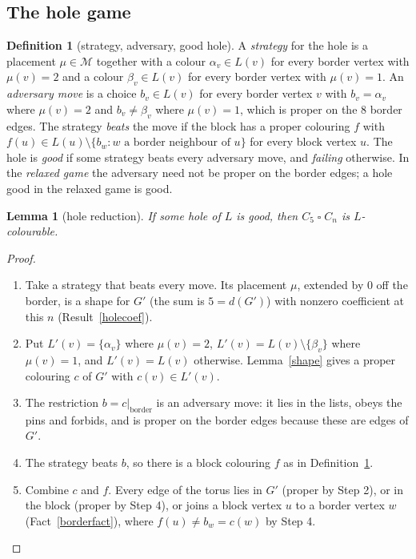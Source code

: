 \documentclass[11pt]{article}
\theoremstyle{plain}
\newtheorem{lemma}[theorem]{Lemma}
\theoremstyle{definition}
\newtheorem{definition}[theorem]{Definition}
\theoremstyle{remark}
\newcommand{\T}{\mathbin{\square}}
\newcommand{\sm}{\setminus}
\newenvironment{steps}[1][]{\begin{enumerate}[label=\textbf{Step \arabic*.},leftmargin=4.4em,itemsep=0.35em,#1]}{\end{enumerate}}
\begin{document}
\subsection{The hole game}

\begin{definition}[strategy, adversary, good hole]\label{game}
A \emph{strategy} for the hole is a placement $\mu \in \mathcal{M}$ together with a colour $\alpha_v \in L(v)$ for every
border vertex with $\mu(v) = 2$ and a colour $\beta_v \in L(v)$ for every border vertex with $\mu(v) = 1$. An
\emph{adversary move} is a choice $b_v \in L(v)$ for every border vertex $v$ with $b_v = \alpha_v$ where $\mu(v) = 2$ and
$b_v \ne \beta_v$ where $\mu(v) = 1$, which is proper on the 8 border edges. The strategy \emph{beats} the move if the block
has a proper colouring $f$ with $f(u) \in L(u) \sm \{b_w : w \text{ a border neighbour of } u\}$ for every block vertex $u$.
The hole is \emph{good} if some strategy beats every adversary move, and \emph{failing} otherwise. In the \emph{relaxed game}
the adversary need not be proper on the border edges; a hole good in the relaxed game is good.
\end{definition}

\begin{lemma}[hole reduction]\label{holered}
If some hole of $L$ is good, then $C_5 \T C_n$ is $L$-colourable.
\end{lemma}

\begin{proof}
\begin{steps}
\item Take a strategy that beats every move. Its placement $\mu$, extended by $0$ off the border, is a shape for $G'$
(the sum is $5 = d(G')$) with nonzero coefficient at this $n$ (Result~\ref{holecoef}).
\item Put $L'(v) = \{\alpha_v\}$ where $\mu(v) = 2$, $L'(v) = L(v) \sm \{\beta_v\}$ where $\mu(v) = 1$, and $L'(v) = L(v)$
otherwise. Lemma~\ref{shape} gives a proper colouring $c$ of $G'$ with $c(v) \in L'(v)$.
\item The restriction $b = c|_{\text{border}}$ is an adversary move: it lies in the lists, obeys the pins and forbids, and is
proper on the border edges because these are edges of $G'$.
\item The strategy beats $b$, so there is a block colouring $f$ as in Definition~\ref{game}.
\item Combine $c$ and $f$. Every edge of the torus lies in $G'$ (proper by Step 2), or in the block (proper by Step 4), or
joins a block vertex $u$ to a border vertex $w$ (Fact~\ref{borderfact}), where $f(u) \ne b_w = c(w)$ by Step 4. \qedhere
\end{steps}
\end{proof}
\end{document}
